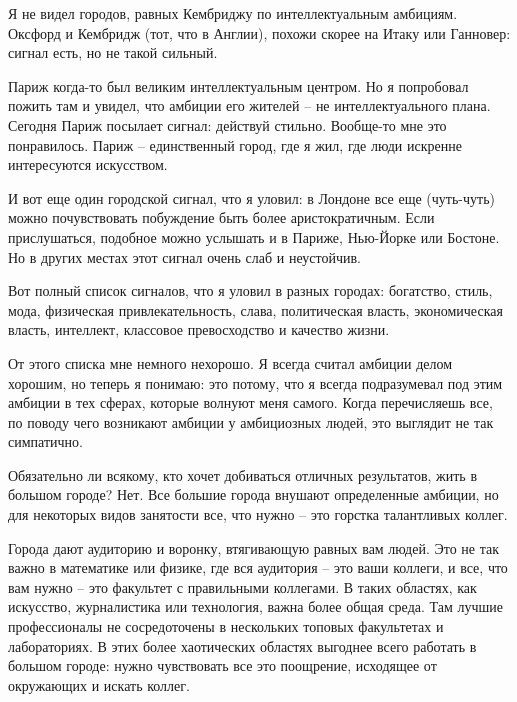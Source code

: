 \documentclass[ebook,12pt,oneside,openany]{memoir}
\begin{document}
Я не видел городов, равных Кембриджу по интеллектуальным амбициям.
Оксфорд и Кембридж (тот, что в Англии), похожи скорее на Итаку или
Ганновер: сигнал есть, но не такой сильный. \newline

Париж когда-то был великим интеллектуальным центром. Но я попробовал
пожить там и увидел, что амбиции его жителей – не интеллектуального
плана. Сегодня Париж посылает сигнал: действуй стильно. Вообще-то мне
это понравилось. Париж – единственный город, где я жил, где люди
искренне интересуются искусством. \newline

И вот еще один городской сигнал, что я уловил: в Лондоне все еще
(чуть-чуть) можно почувствовать побуждение быть более аристократичным.
Если прислушаться, подобное можно услышать и в Париже, Нью-Йорке или
Бостоне. Но в других местах этот сигнал очень слаб и неустойчив. \newline

Вот полный список сигналов, что я уловил в разных городах: богатство,
стиль, мода, физическая привлекательность, слава, политическая власть,
экономическая власть, интеллект, классовое превосходство и качество
жизни. \newline

От этого списка мне немного нехорошо. Я всегда считал амбиции делом
хорошим, но теперь я понимаю: это потому, что я всегда подразумевал
под этим амбиции в тех сферах, которые волнуют меня самого. Когда
перечисляешь все, по поводу чего возникают амбиции у амбициозных
людей, это выглядит не так симпатично. \newline

Обязательно ли всякому, кто хочет добиваться отличных результатов,
жить в большом городе? Нет. Все большие города внушают определенные
амбиции, но для некоторых видов занятости все, что нужно – это горстка
талантливых коллег. \newline

Города дают аудиторию и воронку, втягивающую равных вам людей. Это не
так важно в математике или физике, где вся аудитория – это ваши
коллеги, и все, что вам нужно – это факультет с правильными коллегами.
В таких областях, как искусство, журналистика или технология, важна
более общая среда. Там лучшие профессионалы не сосредоточены в
нескольких топовых факультетах и лабораториях. В этих более
хаотических областях выгоднее всего работать в большом городе: нужно
чувствовать все это поощрение, исходящее от окружающих и искать
коллег. \newline
\end{document}
